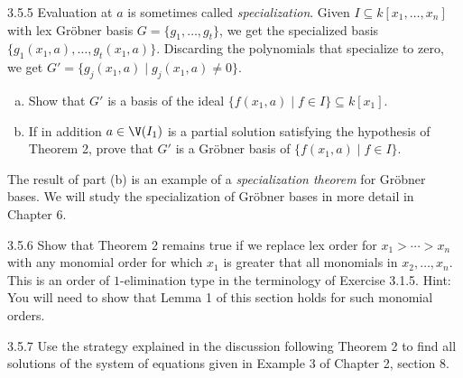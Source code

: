 \documentclass[twoside]{article}
\begin{document}
\newpage

\begin{ejercicio}{3.5.5}
Evaluation at $a$ is sometimes called \emph{specialization}.
Given $I \subseteq k[x_1,\dots,x_n]$ with lex Gröbner basis $G = \{g_1,\dots,g_t\}$, we get the specialized basis $\{g_1(x_1,a),\dots,g_t(x_1,a)\}$.
Discarding the polynomials that specialize to zero, we get $G' = \{g_j(x_1,a) \mid g_j(x_1,a) \neq 0\}$.
\begin{enumerate}[a.]
\item Show that $G'$ is a basis of the ideal $\{f(x_1,a) \mid f \in I\} \subseteq k[x_1]$.
\item If in addition $a \in \V(I_1)$ is a partial solution satisfying the hypothesis of Theorem 2, prove that $G'$ is a Gröbner basis of $\{f(x_1,a) \mid f \in I\}$.
\end{enumerate}
The result of part (b) is an example of a \emph{specialization theorem} for Gröbner bases.
We will study the specialization of Gröbner bases in more detail in Chapter 6.
\end{ejercicio}

\newpage

\begin{ejercicio}{3.5.6}
Show that Theorem 2 remains true if we replace lex order for $x_1 > \cdots > x_n$ with any monomial order for which $x_1$ is greater that all monomials in $x_2,\dots,x_n$.
This is an order of $1$-elimination type in the terminology of Exercise 3.1.5.
Hint: You will need to show that Lemma 1 of this section holds for such monomial orders.
\end{ejercicio}

\newpage

\begin{ejercicio}{3.5.7}
Use the strategy explained in the discussion following Theorem 2 to find all solutions of the system of equations given in Example 3 of Chapter 2, section 8.
\end{ejercicio}
\end{document}
